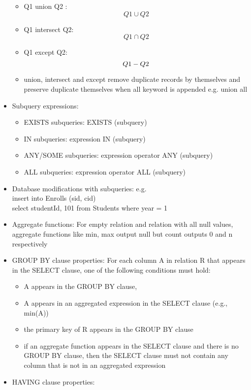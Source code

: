\documentclass[10pt,landscape,a4paper]{scrartcl}
\begin{document}
\begin{multicols*}{4}
\begin{itemize}
      \begin{itemize}
          \item Q1 union Q2 : $$Q1 \cup Q2$$
          \item Q1 intersect Q2: $$Q1 \cap Q2$$
          \item Q1 except Q2: $$Q1 \-- Q2$$
          \item union, intersect and except remove duplicate records by themselves and preserve duplicate themselves when all keyword is appended e.g. union all     
      \end{itemize}
      \item Subquery expressions: 
      \begin{itemize}
          \item EXISTS subqueries: EXISTS (subquery)
          \item IN subqueries: expression IN (subquery)
          \item ANY/SOME subqueries: expression operator ANY (subquery)
          \item ALL subqueries: expression operator ALL (subquery)
      \end{itemize}
      \item Database modifications with subqueries: e.g. \\ insert into Enrolls (sid, cid) \\ select studentId, 101 from Students where year = 1
      \item Aggregate functions: For empty relation and relation with all null values, aggregate functions like min, max output null but count outputs 0 and n respectively
      \item GROUP BY clause properties:
      For each column A in relation R that appears in the SELECT clause, one of the following conditions must hold:
      \begin{itemize}
          \item A appears in the GROUP BY clause,
          \item A appears in an aggregated expression in the SELECT clause (e.g., min(A))
          \item the primary key of R appears in the GROUP BY clause
          \item if an aggregate function appears in the SELECT clause and there is no GROUP BY clause, then the SELECT clause must not contain any column that is not in an aggregated expression
      \end{itemize}
      \item HAVING clause properties:

\end{itemize}
\end{multicols*}
\end{document}
